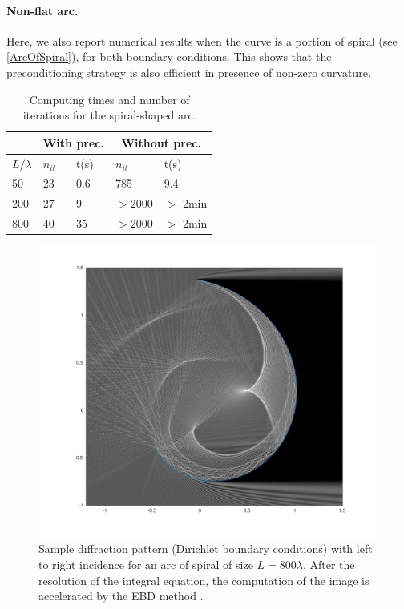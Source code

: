 \documentclass[a4paper]{article}
\begin{document}
\paragraph{Non-flat arc.} Here, we also report numerical results when the curve is a portion of spiral (see \autoref{ArcOfSpiral}), for both boundary conditions. This shows that the preconditioning strategy is also efficient in presence of non-zero curvature. 
\begin{table}[H]
	\begin{center}
		\begin{tabular}{m{4em} | m{4em} | m{4em} | m{4em} | m{4em}} 
			\hline
			\multicolumn{1}{c|}{ }&
			\multicolumn{2}{c|}{With prec.}&\multicolumn{2}{c}{Without prec.}\\
			\hline
			$L/\lambda$ & $n_{it}$& t(s) & $n_{it}$ & t(s)\\
			\hline\hline
			50 & 23 & 0.6 & 785 & 9.4\\
			\hline
			200 & 27 & 9 & $> 2000$ &  $>$ 2min\\
			\hline
			800 & 40 & 35& $> 2000$ &  $>$ 2min\\
			\hline
		\end{tabular}
	\end{center}
	\caption{Computing times and number of iterations for the spiral-shaped arc.}
\end{table}
\vspace{-1cm}
\begin{figure}[H]
	\centering
	\includegraphics[width=\linewidth]{figs/arcOfSpiral800_3}
	\vspace{-1.2cm}
	\caption{Sample diffraction pattern (Dirichlet boundary conditions) with left to right incidence for an arc of spiral of size $L = 800 \lambda$. 
	After the resolution of the integral equation, the computation of the image is accelerated by the EBD method \cite{averseng2017}.}
	\label{ArcOfSpiral}
\end{figure}
\end{document}
